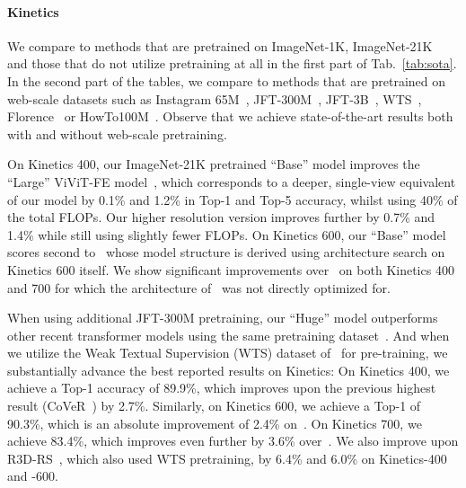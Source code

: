 \paragraph{Kinetics}
We compare to methods that are pretrained on ImageNet-1K, ImageNet-21K~\cite{deng2009imagenet} and those that do not utilize pretraining at all in the first part of Tab.~\ref{tab:sota}.
In the second part of the tables, we compare to methods that are pretrained on web-scale datasets such as Instagram 65M~\cite{ghadiyaram2019large}, JFT-300M~\cite{300m_iccv17}, JFT-3B~\cite{zhai2021scaling}, WTS~\cite{stroud2020learning}, Florence~\cite{yuan2021florence} or HowTo100M~\cite{miech2019howto100m}.
Observe that we achieve state-of-the-art results both with and without web-scale pretraining.

On Kinetics 400, our ImageNet-21K pretrained ``Base'' model improves the ``Large'' ViViT-FE model~\cite{arnab2021vivit}, which corresponds to a  deeper, single-view equivalent of our model by 0.1\% and 1.2\% in Top-1 and Top-5 accuracy, whilst using 40\% of the total FLOPs.
Our higher resolution version improves further by 0.7\% and 1.4\% while still using slightly fewer FLOPs.
On Kinetics 600, our ``Base'' model scores second to~\cite{kondratyuk2021movinets} whose model structure is derived using architecture search on Kinetics 600 itself.
We show significant improvements over~\cite{kondratyuk2021movinets} on both Kinetics 400 and 700 for which the architecture of~\cite{kondratyuk2021movinets} was not directly optimized for.

When using additional JFT-300M pretraining, our ``Huge'' model outperforms other recent transformer models using the same pretraining dataset~\cite{arnab2021vivit, ryoo2021tokenlearner}.
And when we utilize the Weak Textual Supervision (WTS) dataset of~\cite{stroud2020learning} for pre-training, we substantially advance the best reported results on Kinetics:
On Kinetics 400, we achieve a Top-1 accuracy of 89.9\%, which improves upon the previous highest result (CoVeR~\cite{zhang2021co}) by 2.7\%.
Similarly, on Kinetics 600, we achieve a Top-1 of 90.3\%, which is an absolute improvement of 2.4\% on~\cite{zhang2021co}.
On Kinetics 700, we achieve 83.4\%, which improves even further by 3.6\% over~\cite{zhang2021co}.
We also improve upon R3D-RS~\cite{du2021revisiting}, which also used WTS pretraining, by 6.4\% and 6.0\% on Kinetics-400 and -600. 



